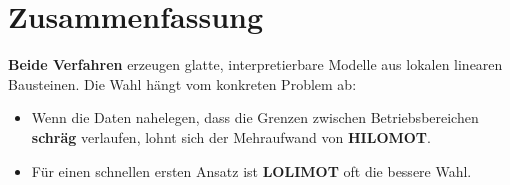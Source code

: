 \documentclass[12pt,a4paper]{article}
\begin{document}
\section{Zusammenfassung}

\textbf{Beide Verfahren} erzeugen glatte, interpretierbare Modelle aus lokalen linearen Bausteinen. Die Wahl hängt vom konkreten Problem ab:

\begin{itemize}
  \item Wenn die Daten nahelegen, dass die Grenzen zwischen Betriebsbereichen \textbf{schräg} verlaufen, lohnt sich der Mehraufwand von \textbf{HILOMOT}.
  \item Für einen schnellen ersten Ansatz ist \textbf{LOLIMOT} oft die bessere Wahl.
\end{itemize}
\end{document}
